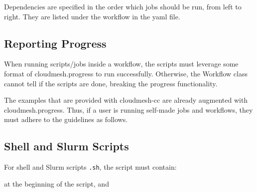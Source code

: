 Dependencies are specified in the order which jobs should be run, from
left to right. They are listed under the workflow in the yaml file.

\begin{Shaded}
\begin{Highlighting}[]
    \ExtensionTok{{-}}
\end{Highlighting}
\end{Shaded}

\hypertarget{reporting-progress}{%
\subsection{Reporting Progress}\label{reporting-progress}}

When running scripts/jobs inside a workflow, the scripts must leverage
some format of cloudmesh.progress to run successfully. Otherwise, the
Workflow class cannot tell if the scripts are done, breaking the
progress functionality.

The examples that are provided with cloudmesh-cc are already augmented
with cloudmesh.progress. Thus, if a user is running self-made jobs and
workflows, they must adhere to the guidelines as follows.

\hypertarget{shell-and-slurm-scripts}{%
\subsection{Shell and Slurm Scripts}\label{shell-and-slurm-scripts}}

For shell and Slurm scripts \texttt{.sh}, the script must contain:

\begin{Shaded}
\begin{Highlighting}[]
 \VariableTok{$$}
\end{Highlighting}
\end{Shaded}

at the beginning of the script, and

\begin{Shaded}
\begin{Highlighting}[]
 \VariableTok{$$}
\end{Highlighting}
\end{Shaded}

